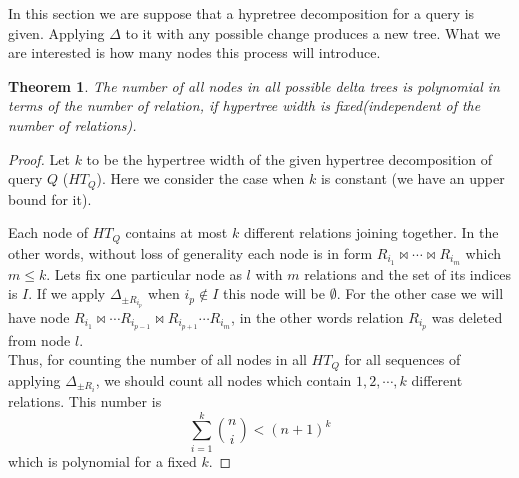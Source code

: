 \documentclass[12pt]{article}
\newtheorem{theorem}{Theorem}
\begin{document}
In this section we are suppose that a hypretree decomposition for a query is given. Applying $\Delta$ to it with any possible change produces a new tree. What we are interested is how many nodes this process will introduce. 

\begin{theorem}
\label{thm:1}
The number of all nodes in all possible delta trees is polynomial in terms of the number of relation, if hypertree width is fixed(independent of the number of relations). 
\end{theorem}
\begin{proof}
Let $k$ to be the hypertree width of the given hypertree decomposition of query $Q$ ($HT_{Q}$). Here we consider the case when $k$ is constant (we have an upper bound for it).

Each node of $HT_{Q}$ contains at most $k$ different relations joining together. In the other words, without loss of generality each node is in form $R_{i_{1}}\Join\cdots\Join R_{i_{m}}$ which $m\leq k$. Lets fix one particular node as $l$ with $m$ relations and the set of its indices is $I$. If we apply $\Delta_{\pm R_{i_{p}}}$ when $i_{p}\not\in I$ this node will be $\emptyset$. For the other case we will have node $R_{i_{1}}\Join\cdots R_{i_{p-1}}\Join R_{i_{p+1}}\cdots R_{i_{m}}$, in the other words relation $R_{i_{p}}$ was deleted from node $l$.\\
Thus, for counting the number of all nodes in all $HT_{Q}$ for all sequences of applying $\Delta_{\pm R_{i}}$, we should count all nodes which contain $1,2,\cdots,k$ different relations. This number is 
\begin{equation}
\sum_{i=1}^{k}{\binom{n}{i}}<(n+1)^{k}
\end{equation}
which is polynomial for a fixed $k$. 
\end{proof}
\end{document}
